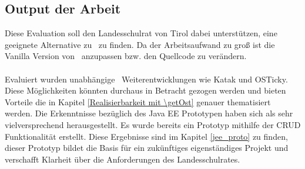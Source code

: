 \subsection{Output der Arbeit}
Diese Evaluation soll den Landesschulrat von Tirol dabei unterstützen, eine geeignete Alternative zu \getOst\ zu finden. Da der Arbeitsaufwand zu groß ist die Vanilla Version von \getOst\ anzupassen bzw. den Quellcode zu verändern.
\paragraph{}
Evaluiert wurden unabhängige \getOst\ Weiterentwicklungen wie Katak und OSTicky. Diese Möglichkeiten könnten durchaus in Betracht gezogen werden und bieten Vorteile die in Kapitel \ref{Realisierbarkeit mit \getOst} genauer thematisiert werden. Die Erkenntnisse bezüglich des Java EE Prototypen haben sich als sehr vielversprechend herausgestellt. Es wurde bereits ein Prototyp mithilfe der CRUD Funktionalität erstellt. Diese Ergebnisse sind im Kapitel \ref{jee_proto} zu finden, dieser Prototyp bildet die Basis für ein zukünftiges eigenständiges Projekt und verschafft Klarheit über die Anforderungen des Landesschulrates.
